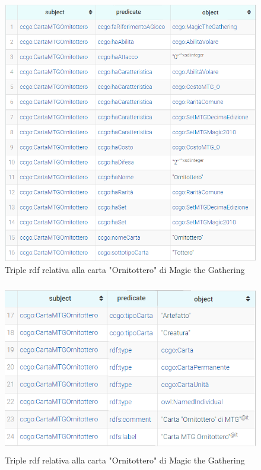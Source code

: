\documentclass[12pt]{article}
\begin{document}
\begin{figure}[H]
    \centering
    \includegraphics[width=14cm]{files/triple_ornitottero.png}
    \caption{Triple rdf relativa alla carta "Ornitottero" di Magic the Gathering}
    \label{fig:triple_ornitottero_1}
\end{figure}
\begin{figure}[H]
    \centering
    \includegraphics[height=7.5cm]{files/triple_ornitottero_2.png}
    \caption{Triple rdf relativa alla carta "Ornitottero" di Magic the Gathering}
    \label{fig:triple_ornitottero_2}
\end{figure}
\end{document}
